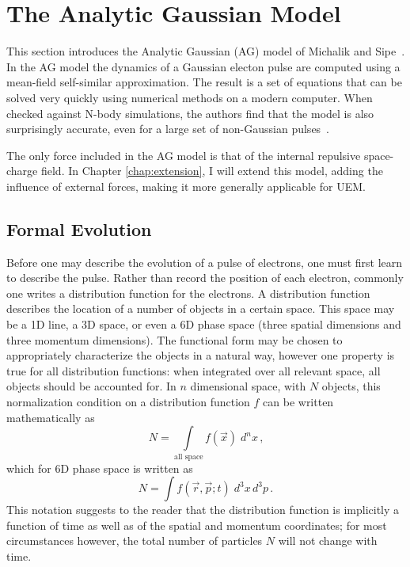 
\section{The Analytic Gaussian Model} \label{sec:ms_model}

This section introduces the Analytic Gaussian (AG) model of Michalik and Sipe~\cite{michalik_analytic_2006}.
In the AG model the dynamics of a Gaussian electon pulse are computed using a mean-field self-similar approximation.
The result is a set of equations that can be solved very quickly using numerical methods on a modern computer.
When checked against N-body simulations, the authors find that the model is also surprisingly accurate, even for a large set of non-Gaussian pulses~\cite{michalik_analytic_2006,michalik_evolution_2009}.

The only force included in the AG model is that of the internal repulsive space-charge field.
In Chapter \ref{chap:extension}, I will extend this model, adding the influence of external forces, making it more generally applicable for UEM.

\subsection{Formal Evolution} \label{sec:formal_evolution}

Before one may describe the evolution of a pulse of electrons, one must first learn to describe the pulse.
Rather than record the position of each electron, commonly one writes a distribution function for the electrons.
A distribution function describes the location of a number of objects in a certain space.
This space may be a 1D line, a 3D space, or even a 6D phase space (three spatial dimensions and three momentum dimensions).
The functional form may be chosen to appropriately characterize the objects in a natural way, however one property is true for all distribution functions: when integrated over all relevant space, all objects should be accounted for.
In $n$ dimensional space, with $N$ objects, this normalization condition on a distribution function $f$ can be written mathematically as
\begin{equation}
  N = \int\limits_{\text{all space}} \!\!\! f(\vec{x}) \; d^{n}x \,\text{,}
\end{equation}
which for 6D phase space is written as
\begin{equation} \label{eq:normalization}
  N = \int f (\vec{r}, \vec{p}; t) \; d^{3}x\,d^{3}p \,\text{.}
\end{equation}
This notation suggests to the reader that the distribution function is implicitly a function of time as well as of the spatial and momentum coordinates; for most circumstances however, the total number of particles $N$ will not change with time.


